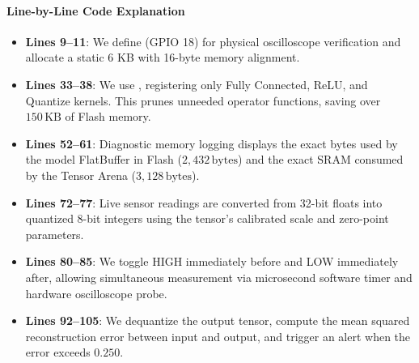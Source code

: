 \paragraph{Line-by-Line Code Explanation}
\begin{itemize}
    \item \textbf{Lines 9--11}: We define  (GPIO 18) for physical oscilloscope verification and allocate a static 6 KB  with 16-byte memory alignment.
    \item \textbf{Lines 33--38}: We use , registering only Fully Connected, ReLU, and Quantize kernels. This prunes unneeded operator functions, saving over $150\,\text{KB}$ of Flash memory.
    \item \textbf{Lines 52--61}: Diagnostic memory logging displays the exact bytes used by the model FlatBuffer in Flash ($2{,}432\,\text{bytes}$) and the exact SRAM consumed by the Tensor Arena ($3{,}128\,\text{bytes}$).
    \item \textbf{Lines 72--77}: Live sensor readings are converted from 32-bit floats into quantized 8-bit integers using the tensor's calibrated scale and zero-point parameters.
    \item \textbf{Lines 80--85}: We toggle  HIGH immediately before  and LOW immediately after, allowing simultaneous measurement via microsecond software timer and hardware oscilloscope probe.
    \item \textbf{Lines 92--105}: We dequantize the output tensor, compute the mean squared reconstruction error between input and output, and trigger an alert when the error exceeds $0.250$.
\end{itemize}

